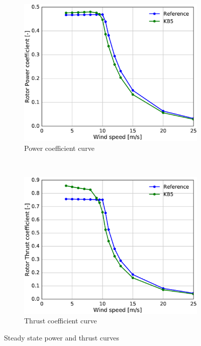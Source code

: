 \begin{figure}[tph]
\begin{subfigure}{0.50\textwidth}
\includegraphics[width=\linewidth]{figures/KB6_final/KB5_Cp_HS2.eps}
\caption{Power coefficient curve}
\label{subfig:KB5_CP}
\end{subfigure}
 ~
\begin{subfigure}{0.50\textwidth}
\includegraphics[width=\linewidth]{figures/KB6_final/KB5_CT_HS2.eps}
\caption{Thrust coefficient curve}
\label{subfig:KB5_CT}
\end{subfigure}

\caption{Steady state power and thrust curves}
\label{fig:KB5_power_thrust}
\end{figure}

